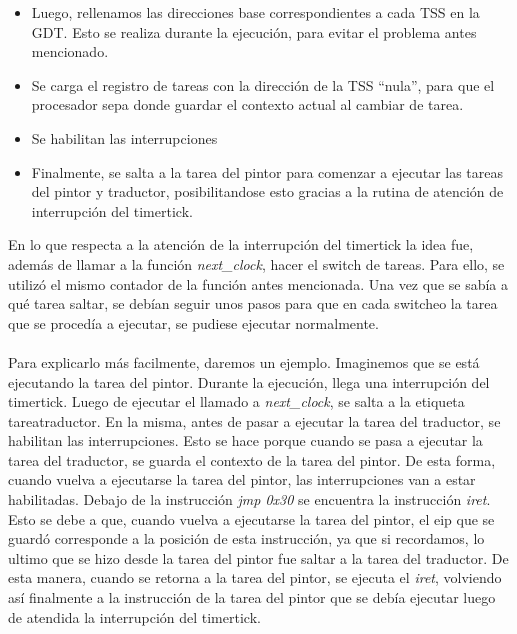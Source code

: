 \begin{itemize}
 \item Luego, rellenamos las direcciones base correspondientes a cada TSS en la GDT. Esto se realiza durante la ejecuci\'on, para evitar el problema antes mencionado.
 \item Se carga el registro de tareas con la direcci\'on de la TSS ``nula'', para que el procesador sepa donde guardar el contexto actual al cambiar de tarea.
 \item Se habilitan las interrupciones
 \item Finalmente, se salta a la tarea del pintor para comenzar a ejecutar las tareas del pintor y traductor, posibilitandose esto gracias a la rutina de atenci\'on de interrupci\'on del timertick.
\end{itemize}

En lo que respecta a la atenci\'on de la interrupci\'on del timertick la idea fue, adem\'as de llamar a la funci\'on \textit{next\_clock}, hacer el switch de tareas. Para ello, se utiliz\'o el mismo contador de la funci\'on antes mencionada. Una vez que se sab\'ia a qu\'e tarea saltar, se deb\'ian seguir unos pasos para que en cada switcheo la tarea que se proced\'ia a ejecutar, se pudiese ejecutar normalmente.
\paragraph{}
Para explicarlo m\'as facilmente, daremos un ejemplo. Imaginemos que se est\'a ejecutando la tarea del pintor. Durante la ejecuci\'on, llega una interrupci\'on del timertick. Luego de ejecutar el llamado a \textit{next\_clock}, se salta a la etiqueta tareatraductor. En la misma, antes de pasar a ejecutar la tarea del traductor, se habilitan las interrupciones. Esto se hace porque cuando se pasa a ejecutar la tarea del traductor, se guarda el contexto de la tarea del pintor. De esta forma, cuando vuelva a ejecutarse la tarea del pintor, las interrupciones van a estar habilitadas. Debajo de la instrucci\'on \textit{jmp 0x30} se encuentra la instrucci\'on \textit{iret}. Esto se debe a que, cuando vuelva a ejecutarse la tarea del pintor, el eip que se guard\'o corresponde a la posici\'on de esta instrucci\'on, ya que si recordamos, lo ultimo que se hizo desde la tarea del pintor fue saltar a la tarea del traductor. De esta manera, cuando se retorna a la tarea del pintor, se ejecuta el \textit{iret}, volviendo as\'i finalmente a la instrucci\'on de la tarea del pintor que se deb\'ia ejecutar luego de atendida la interrupci\'on del timertick.